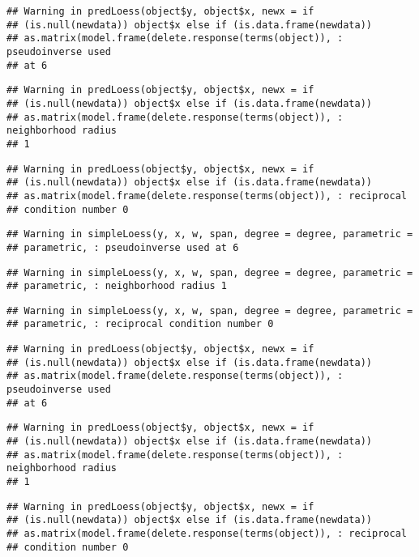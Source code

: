 \documentclass[]{article}
\begin{document}
\begin{verbatim}
## Warning in predLoess(object$y, object$x, newx = if
## (is.null(newdata)) object$x else if (is.data.frame(newdata))
## as.matrix(model.frame(delete.response(terms(object)), : pseudoinverse used
## at 6
\end{verbatim}

\begin{verbatim}
## Warning in predLoess(object$y, object$x, newx = if
## (is.null(newdata)) object$x else if (is.data.frame(newdata))
## as.matrix(model.frame(delete.response(terms(object)), : neighborhood radius
## 1
\end{verbatim}

\begin{verbatim}
## Warning in predLoess(object$y, object$x, newx = if
## (is.null(newdata)) object$x else if (is.data.frame(newdata))
## as.matrix(model.frame(delete.response(terms(object)), : reciprocal
## condition number 0
\end{verbatim}

\begin{verbatim}
## Warning in simpleLoess(y, x, w, span, degree = degree, parametric =
## parametric, : pseudoinverse used at 6
\end{verbatim}

\begin{verbatim}
## Warning in simpleLoess(y, x, w, span, degree = degree, parametric =
## parametric, : neighborhood radius 1
\end{verbatim}

\begin{verbatim}
## Warning in simpleLoess(y, x, w, span, degree = degree, parametric =
## parametric, : reciprocal condition number 0
\end{verbatim}

\begin{verbatim}
## Warning in predLoess(object$y, object$x, newx = if
## (is.null(newdata)) object$x else if (is.data.frame(newdata))
## as.matrix(model.frame(delete.response(terms(object)), : pseudoinverse used
## at 6
\end{verbatim}

\begin{verbatim}
## Warning in predLoess(object$y, object$x, newx = if
## (is.null(newdata)) object$x else if (is.data.frame(newdata))
## as.matrix(model.frame(delete.response(terms(object)), : neighborhood radius
## 1
\end{verbatim}

\begin{verbatim}
## Warning in predLoess(object$y, object$x, newx = if
## (is.null(newdata)) object$x else if (is.data.frame(newdata))
## as.matrix(model.frame(delete.response(terms(object)), : reciprocal
## condition number 0
\end{verbatim}
\end{document}
